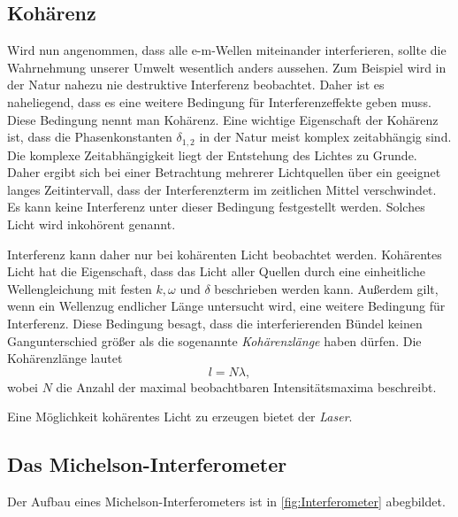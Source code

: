 \subsection{Kohärenz}
\label{subsec:Kohärenz}
Wird nun angenommen, dass alle e-m-Wellen miteinander interferieren, sollte die Wahrnehmung unserer Umwelt wesentlich anders aussehen. Zum Beispiel wird in der Natur nahezu 
nie destruktive Interferenz beobachtet. Daher ist es naheliegend, dass es eine weitere Bedingung für Interferenzeffekte geben muss. Diese Bedingung nennt man Kohärenz. 
Eine wichtige Eigenschaft der Kohärenz ist, dass die Phasenkonstanten $\delta_{1,2}$ in der Natur meist komplex zeitabhängig sind. Die komplexe Zeitabhängigkeit liegt der 
Entstehung des Lichtes zu Grunde. Daher ergibt sich bei einer Betrachtung mehrerer Lichtquellen über ein geeignet langes Zeitintervall, dass der Interferenzterm im zeitlichen 
Mittel verschwindet. Es kann keine Interferenz unter dieser Bedingung festgestellt werden. Solches Licht wird inkohörent genannt. 

Interferenz kann daher nur bei kohärenten Licht beobachtet werden. Kohärentes Licht hat die Eigenschaft, dass das Licht aller Quellen durch eine einheitliche Wellengleichung 
mit festen $k, \omega$ und $\delta$ beschrieben werden kann. Außerdem gilt, wenn ein Wellenzug endlicher Länge untersucht wird, eine weitere Bedingung für Interferenz. 
Diese Bedingung besagt, dass die interferierenden Bündel keinen Gangunterschied größer als die sogenannte \textit{Kohärenzlänge} haben dürfen. Die Kohärenzlänge lautet 
\begin{equation*}
    l = N\lambda,
\end{equation*}  
wobei $N$ die Anzahl der maximal beobachtbaren Intensitätsmaxima beschreibt. 

Eine Möglichkeit kohärentes Licht zu erzeugen bietet der \textit{Laser}. 

\subsection{Das Michelson-Interferometer}
\label{subsec:Interferometer}
Der Aufbau eines Michelson-Interferometers ist in \autoref{fig:Interferometer} abegbildet. 

